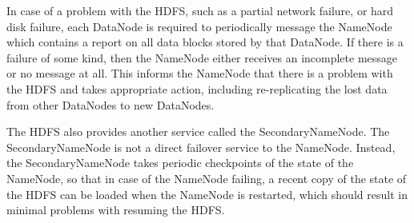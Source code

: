 In case of a problem with the HDFS, such as a partial network failure, or hard disk failure, each DataNode is required to periodically message the NameNode which contains a report on all data blocks stored by that DataNode. If there is a failure of some kind, then the NameNode either receives an incomplete message or no message at all. This informs the NameNode that there is a problem with the HDFS and takes appropriate action, including re-replicating the lost data from other DataNodes to new DataNodes.

The HDFS also provides another service called the SecondaryNameNode. The SecondaryNameNode is not a direct failover service to the NameNode. Instead, the SecondaryNameNode takes periodic checkpoints of the state of the NameNode, so that in case of the NameNode failing, a recent copy of the state of the HDFS can be loaded when the NameNode is restarted, which should result in minimal problems with resuming the HDFS.